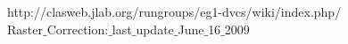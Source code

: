  http://clasweb.jlab.org/rungroups/eg1-dvcs/wiki/index.php/\\Raster$\_$Correction:$\_$last$\_$update$\_$June$\_$16$\_$2009






